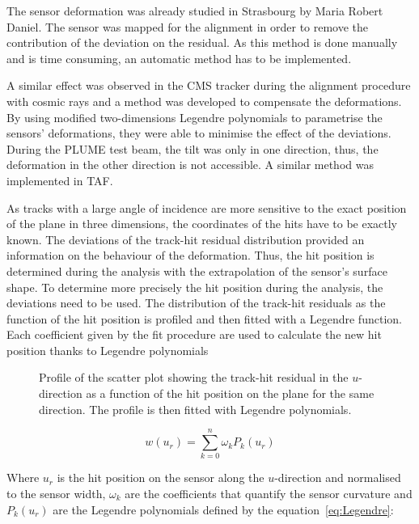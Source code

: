       The sensor deformation was already studied in Strasbourg by Maria Robert Daniel.
      The sensor was mapped for the alignment in order to remove the contribution of the deviation on the residual\cite{maria}.
      As this method is done manually and is time consuming, an automatic method has to be implemented.

      A similar effect was observed in the CMS tracker during the alignment procedure with cosmic rays and a method was developed to compensate the deformations\cite{CMSalignment}. 
      By using modified two-dimensions Legendre polynomials to parametrise the sensors' deformations, they were able to minimise the effect of the deviations.
      During the PLUME test beam, the tilt was only in one direction, thus, the deformation in the other direction is not accessible.
      A similar method was implemented in TAF.

      As tracks with a large angle of incidence are more sensitive to the exact position of the plane in three dimensions, the coordinates of the hits have to be exactly known.
      The deviations of the track-hit residual distribution provided an information on the behaviour of the deformation.
      Thus, the hit position is determined during the analysis with the extrapolation of the sensor's surface shape.
      To determine more precisely the hit position during the analysis, the deviations need to be used. 
      The distribution of the track-hit residuals as the function of the hit position is profiled and then fitted with a Legendre function. 
      Each coefficient given by the fit procedure are used to calculate the new hit position thanks to Legendre polynomials

      \begin{figure}
        \caption{Profile of the scatter plot showing the track-hit residual in the $u$-direction as a function of the hit position on the plane for the same direction. The profile is then fitted with Legendre polynomials.}
        \label{fig:profileFitted}
      \end{figure}

      \begin{equation}
        w\left(u_{r}\right) = \sum_{k=0}^n \omega_{k}P_{k}\left(u_{r}\right)
        \label{eq:polynomials}
      \end{equation}

      Where $u_{r}$ is the hit position on the sensor along the $u$-direction and normalised to the sensor width, $\omega_{k}$ are the coefficients that quantify the sensor curvature and $P_{k}(u_{r})$ are the Legendre polynomials defined by the equation~\ref{eq:Legendre}:

